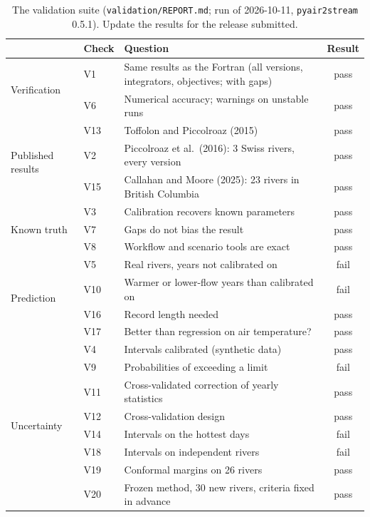 \documentclass[11pt,a4paper]{article}
\newcommand{\fact}[1]{\textcolor{teal!70!black}{#1}}
\newcommand{\fact}[1]{#1}
\newcommand{\pkg}{\texttt{pyair2stream}}
\newcommand{\repo}[1]{\texttt{#1}}   %
\newcommand{\version}{0.5.1}
\begin{document}
\begin{table}[htbp]
  \centering
  \caption{The validation suite (\repo{validation/REPORT.md}; run of
  2026-10-11, \pkg{} \version). \fact{Update the results for the release submitted.}}
  \label{tab:validation}
  \small
  \begin{tabularx}{\linewidth}{@{}llXc@{}}
    \toprule
    & Check & Question & Result \\
    \midrule
    \multirow{2}{*}{Verification}
      & V1  & Same results as the Fortran (all versions, integrators, objectives; with gaps) & \fact{pass} \\
      & V6  & Numerical accuracy; warnings on unstable runs & \fact{pass} \\
    \midrule
    \multirow{3}{*}{Published results}
      & V13 & Toffolon and Piccolroaz (2015) & \fact{pass} \\
      & V2  & Piccolroaz et al.\ (2016): 3 Swiss rivers, every version & \fact{pass} \\
      & V15 & Callahan and Moore (2025): 23 rivers in British Columbia & \fact{pass} \\
    \midrule
    \multirow{3}{*}{Known truth}
      & V3  & Calibration recovers known parameters & \fact{pass} \\
      & V7  & Gaps do not bias the result & \fact{pass} \\
      & V8  & Workflow and scenario tools are exact & \fact{pass} \\
    \midrule
    \multirow{4}{*}{Prediction}
      & V5  & Real rivers, years not calibrated on & \fact{fail} \\
      & V10 & Warmer or lower-flow years than calibrated on & \fact{fail} \\
      & V16 & Record length needed & \fact{pass} \\
      & V17 & Better than regression on air temperature? & \fact{pass} \\
    \midrule
    \multirow{8}{*}{Uncertainty}
      & V4  & Intervals calibrated (synthetic data) & \fact{pass} \\
      & V9  & Probabilities of exceeding a limit & \fact{fail} \\
      & V11 & Cross-validated correction of yearly statistics & \fact{pass} \\
      & V12 & Cross-validation design & \fact{pass} \\
      & V14 & Intervals on the hottest days & \fact{fail} \\
      & V18 & Intervals on independent rivers & \fact{fail} \\
      & V19 & Conformal margins on 26 rivers & \fact{pass} \\
      & V20 & Frozen method, 30 new rivers, criteria fixed in advance & \fact{pass} \\
    \bottomrule
  \end{tabularx}
\end{table}
\end{document}
